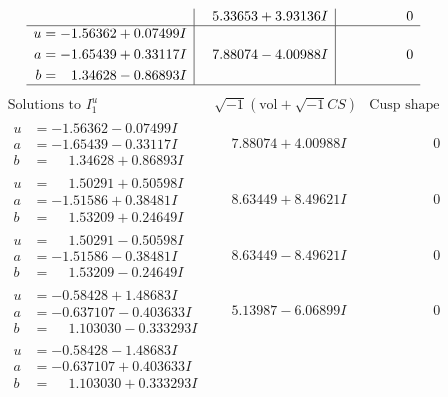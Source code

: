 \documentclass[1p]{elsarticle_modified}
\theoremstyle{definition}
\newcommand{\I}{\sqrt{-1}}
\begin{document}
$$\begin{array}{c|c|c}
 & \phantom{-}5.33653 + 3.93136 I & \phantom{-0.000000 } 0 \\ \hline\begin{aligned}
u &= -1.56362 + 0.07499 I \\
a &= -1.65439 + 0.33117 I \\
b &= \phantom{-}1.34628 - 0.86893 I\end{aligned}
 & \phantom{-}7.88074 - 4.00988 I & \phantom{-0.000000 } 0\\
 \hline 
 \end{array}$$\newpage$$\begin{array}{c|c|c}  
\text{Solutions to }I^u_{1}& \I (\text{vol} + \sqrt{-1}CS) & \text{Cusp shape}\\
 \hline 
\begin{aligned}
u &= -1.56362 - 0.07499 I \\
a &= -1.65439 - 0.33117 I \\
b &= \phantom{-}1.34628 + 0.86893 I\end{aligned}
 & \phantom{-}7.88074 + 4.00988 I & \phantom{-0.000000 } 0 \\ \hline\begin{aligned}
u &= \phantom{-}1.50291 + 0.50598 I \\
a &= -1.51586 + 0.38481 I \\
b &= \phantom{-}1.53209 + 0.24649 I\end{aligned}
 & \phantom{-}8.63449 + 8.49621 I & \phantom{-0.000000 } 0 \\ \hline\begin{aligned}
u &= \phantom{-}1.50291 - 0.50598 I \\
a &= -1.51586 - 0.38481 I \\
b &= \phantom{-}1.53209 - 0.24649 I\end{aligned}
 & \phantom{-}8.63449 - 8.49621 I & \phantom{-0.000000 } 0 \\ \hline\begin{aligned}
u &= -0.58428 + 1.48683 I \\
a &= -0.637107 - 0.403633 I \\
b &= \phantom{-}1.103030 - 0.333293 I\end{aligned}
 & \phantom{-}5.13987 - 6.06899 I & \phantom{-0.000000 } 0 \\ \hline\begin{aligned}
u &= -0.58428 - 1.48683 I \\
a &= -0.637107 + 0.403633 I \\
b &= \phantom{-}1.103030 + 0.333293 I\end{aligned}

\end{array}$$
\end{document}
